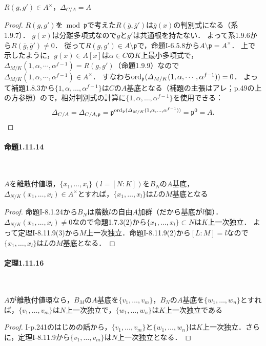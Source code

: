 \begin{screen}
  $R(g,g')\in A^\times$，$\varDelta_{C/A}=A$
\end{screen}
\begin{proof}
  $R(g,g')$を$\bmod\mathfrak{p}$で考えた$R(\overline{g},\overline{g}')$は$\overline{g}(x)$の判別式になる（系1.9.7）．
  $\overline{g}(x)$は分離多項式なので$\overline{g}$と$\overline{g}'$は共通根を持たない．
  よって系1.9.6から$R(\overline{g},\overline{g}')\neq 0$．
  従って$R(g,g')\in A\setminus\mathfrak{p}$で，命題I-6.5.8から$A\setminus\mathfrak{p}=A^\times$．
  上で示したように，$g(x)\in A[x]$は$\alpha\in C$の$K$上最小多項式で，$\varDelta_{M/K}(1,\alpha,\cdots,\alpha^{f-1}) = R(g,g')$（命題1.9.9）なので$\varDelta_{M/K}(1,\alpha,\cdots,\alpha^{f-1})\in A^\times$．
  すなわち$\operatorname{ord}_\mathfrak{p}(\varDelta_{M/K}(1,\alpha,\cdots,\alpha^{f-1}))=0$．
  よって補題1.8.3から$\{1,\alpha,\ldots,\alpha^{f-1}\}$は$C$の$A$基底となる（補題の主張はアレ；p.49の上の方参照）ので，相対判別式の計算に$\{1,\alpha,\ldots,\alpha^{f-1}\}$を使用できる：
  \[\varDelta_{C/A}=\varDelta_{C/A,\mathfrak{p}}=\mathfrak{p}^{\operatorname{ord}_\mathfrak{p}(\varDelta_{M/K}(1,\alpha,\ldots,\alpha^{f-1}))}=\mathfrak{p}^{0}=A.\]
\end{proof}

\paragraph{命題1.11.14}~
\begin{screen}
  $A$を離散付値環，$\{x_1,\ldots,x_l\}\ (l=[N:K])$を$B_N$の$A$基底，$\varDelta_{N/K}(x_1,\ldots,x_l)\in A^\times$とすれば，$\{x_1,\ldots,x_l\}$は$L$の$M$基底となる
\end{screen}
\begin{proof}
  命題I-8.1.24から$B_N$は階数$l$の自由$A$加群（だから基底が$l$個）．
  $\varDelta_{N/K}(x_1,\ldots,x_l)\neq 0$なので命題1.7.3(2)から$\{x_1,\ldots,x_l\}\subset N$は$K$上一次独立．
  よって定理I-8.11.9(3)から$M$上一次独立．命題I-8.11.9(2)から$[L:M]=l$なので$\{x_1,\ldots,x_l\}$は$L$の$M$基底となる．
\end{proof}

\paragraph{定理1.11.16}~
\begin{screen}
  $A$が離散付値環なら，$B_M$の$A$基底を$\{v_1,\ldots,v_m\}$，$B_N$の$A$基底を$\{w_1,\ldots,w_n\}$とすれば，$\{v_1,\ldots,v_m\}$は$N$上一次独立で，$\{w_1,\ldots,w_n\}$は$K$上一次独立である
\end{screen}
\begin{proof}
  I-p.241のはじめの話から，$\{v_1,\ldots,v_m\}$と$\{w_1,\ldots,w_n\}$は$K$上一次独立．さらに，定理I-8.11.9から$\{v_1,\ldots,v_m\}$は$N$上一次独立となる．
\end{proof}

